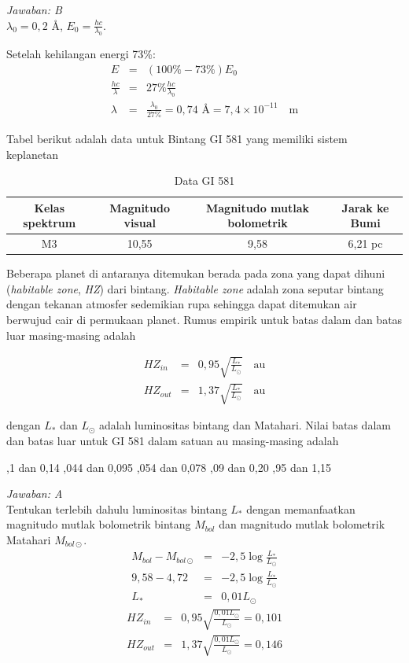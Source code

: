 \documentclass[11pt,fleqn]{exam}
\begin{document}
\begin{questions}
\textit{Jawaban: B} \\
$\lambda_0=0,2$ \AA, $E_0=\frac{hc}{\lambda_0}$. 

Setelah kehilangan energi 73\%: 
\begin{eqnarray*}
E &=& (100\%-73\%)E_0\\
\frac{hc}{\lambda} &=& 27\% \frac{hc}{\lambda_0}\\
\lambda &=& \frac{\lambda_0}{27\%} = 0,74 \text{ \AA} = 7,4\times 10^{-11} \quad \text{m}
\end{eqnarray*}


\vspace{0.3cm}
\question Tabel berikut adalah data untuk Bintang GI 581 yang memiliki sistem keplanetan

\begin{table}[h!]
\centering
\caption*{Data GI 581}
\begin{tabular}{|c|c|c|c|}
\hline
Kelas spektrum & Magnitudo visual & Magnitudo mutlak bolometrik & Jarak ke Bumi \\
\hline
M3 & 10,55 & 9,58 & 6,21 pc \\
\hline
\end{tabular}
\end{table}

Beberapa planet di antaranya ditemukan berada pada zona yang dapat dihuni (\textit{habitable zone}, \textit{HZ}) dari bintang. \textit{Habitable zone} adalah zona seputar bintang dengan tekanan atmosfer sedemikian rupa sehingga dapat ditemukan air berwujud cair di permukaan planet. Rumus empirik untuk batas dalam dan batas luar masing-masing adalah

\begin{eqnarray*}
HZ_{in} &=& 0,95\sqrt{\frac{L_*}{L_{\odot}}} \quad \text{au} \\
HZ_{out} &=& 1,37\sqrt{\frac{L_*}{L_{\odot}}} \quad \text{au}
\end{eqnarray*}

dengan $L_*$ dan $L_{\odot}$ adalah luminositas bintang dan Matahari. Nilai batas dalam dan batas luar untuk GI 581 dalam satuan au masing-masing adalah
\begin{choices}
,1 dan 0,14
,044 dan 0,095
,054 dan 0,078
,09 dan 0,20
,95 dan 1,15
\end{choices}

\textit{Jawaban: A}\\
Tentukan terlebih dahulu luminositas bintang $L_*$ dengan memanfaatkan magnitudo mutlak bolometrik bintang $M_{bol}$ dan magnitudo mutlak bolometrik Matahari $M_{bol \odot}$.
\begin{eqnarray*}
M_{bol}-M_{bol \odot} &=& -2,5\log\frac{L_*}{L_{\odot}}\\
9,58-4,72 &=& -2,5\log\frac{L_*}{L_{\odot}}\\
L_* &=& 0,01L_{\odot}
\end{eqnarray*}
\begin{eqnarray*}
HZ_{in} &=& 0,95\sqrt{\frac{0,01L_{\odot}}{L_{\odot}}} = 0,101\\
HZ_{out} &=& 1,37\sqrt{\frac{0,01L_{\odot}}{L_{\odot}}}=0,146
\end{eqnarray*}


\end{questions}
\end{document}
